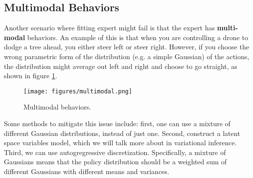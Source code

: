 \subsection{Multimodal Behaviors}
Another scenario where fitting expert might fail is that the expert has \textbf{multi-modal} behaviors. An example of this is that when you are controlling a drone to dodge a tree ahead, you either steer left or steer right. However, if you choose the wrong parametric form of the distribution (e.g. a simple Gaussian) of the actions, the distribution might average out left and right and choose to go straight, as shown in figure \ref{fig:multimodal}.
\begin{figure}
    \centering
    \texttt{[image: figures/multimodal.png]}
    \caption{Multimodal behaviors.}
    \label{fig:multimodal}
\end{figure}
Some methods to mitigate this issue include: first, one can use a mixture of different Gaussian distributions, instead of just one. Second, construct a latent space variables model, which we will talk more about in variational inference. Third, we can use autogregressive discretization. Specifically, a mixture of Gaussians means that the policy distribution should be a weighted sum of different Gaussians with different means and variances. 

